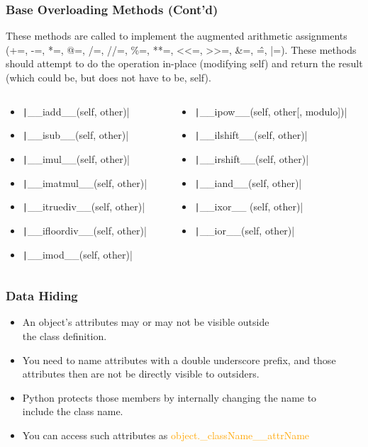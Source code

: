 \documentclass{../py-lecture}
\begin{document}
\begin{frame}
	\frametitle{Base Overloading Methods (Cont'd)}
  These methods are called to implement the augmented arithmetic assignments (+=, -=, *=, @=, /=, //=, \%=, **=, <<=, >>=, \&=, \^=, |=).
  These methods should attempt to do the operation in-place (modifying self) and return the result (which could be, but does not have to be, self).
  \begin{columns}
    \begin{column}{.5\textwidth}
      \begin{itemize}
        \item \texttt|__iadd__(self, other)|
        \item \texttt|__isub__(self, other)|
        \item \texttt|__imul__(self, other)|
        \item \texttt|__imatmul__(self, other)|
        \item \texttt|__itruediv__(self, other)|
        \item \texttt|__ifloordiv__(self, other)|
        \item \texttt|__imod__(self, other)|
      \end{itemize}
    \end{column}
    \begin{column}{.5\textwidth}
      \begin{itemize}
        \item \texttt|__ipow__(self, other[, modulo])|
        \item \texttt|__ilshift__(self, other)|
        \item \texttt|__irshift__(self, other)|
        \item \texttt|__iand__(self, other)|
        \item \texttt|__ixor__ (self, other)|
        \item \texttt|__ior__(self, other)|
      \end{itemize}
    \end{column}
  \end{columns}
\end{frame}

\begin{frame}
	\frametitle{Data Hiding}
			\begin{itemize}
				\item An object's attributes may or may not be visible outside \\
				the class definition.
				\item You need to name attributes with a double underscore prefix, and those \\
				attributes then are not be directly visible to outsiders.
				\item Python protects those members by internally changing the name to \\
				include the class name.
				\item You can access such attributes as \textcolor{Orange}{object.\_className\_\_attrName}
			\end{itemize}
\end{frame}
\end{document}
